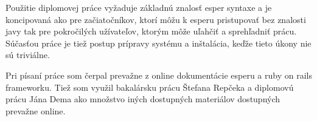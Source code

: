 Použitie diplomovej práce vyžaduje základnú znalosť esper syntaxe a je koncipovaná ako pre začiatočníkov, ktorí môžu k esperu pristupovať bez znalosti javy tak pre pokročilých užívateľov, ktorým môže uľahčiť a sprehľadniť prácu. Súčasťou práce je tiež postup prípravy systému a inštalácia, keďže tieto úkony nie sú triviálne.

Pri písaní práce som čerpal prevažne z online dokumentácie esperu a ruby on rails frameworku. Tiež som využil bakalársku prácu Štefana Repčeka \cite{bp-repcek} a diplomovú prácu Jána Dema \cite{dp-demo} ako množstvo iných dostupných materiálov dostupných prevažne online.

\emptydoublepage